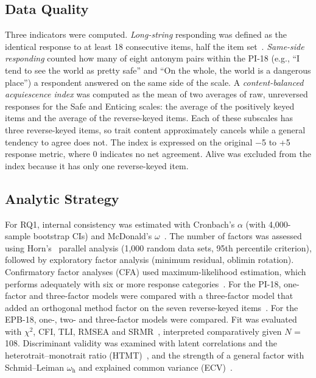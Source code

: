 \documentclass[journal,a4paper]{IEEEtran}
\begin{document}
\subsection{Data Quality}

Three indicators were computed. \emph{Long-string} responding was defined as the identical response to at least 18 consecutive items, half the item set~\cite{curran2016,meade2012}. \emph{Same-side responding} counted how many of eight antonym pairs within the PI-18 (e.g., ``I tend to see the world as pretty safe'' and ``On the whole, the world is a dangerous place'') a respondent answered on the same side of the scale. A \emph{content-balanced acquiescence index} was computed as the mean of two averages of raw, unreversed responses for the Safe and Enticing scales: the average of the positively keyed items and the average of the reverse-keyed items. Each of these subscales has three reverse-keyed items, so trait content approximately cancels while a general tendency to agree does not. The index is expressed on the original $-$5 to +5 response metric, where 0 indicates no net agreement. Alive was excluded from the index because it has only one reverse-keyed item.

\subsection{Analytic Strategy}

For RQ1, internal consistency was estimated with Cronbach's $\alpha$ (with 4,000-sample bootstrap CIs) and McDonald's $\omega$~\cite{mcneish2018}. The number of factors was assessed using Horn's~\cite{horn1965} parallel analysis (1,000 random data sets, 95th percentile criterion), followed by exploratory factor analysis (minimum residual, oblimin rotation). Confirmatory factor analyses (CFA) used maximum-likelihood estimation, which performs adequately with six or more response categories~\cite{rhemtulla2012}. For the PI-18, one-factor and three-factor models were compared with a three-factor model that added an orthogonal method factor on the seven reverse-keyed items~\cite{marsh1996}. For the EPB-18, one-, two- and three-factor models were compared. Fit was evaluated with $\chi ^2$, CFI, TLI, RMSEA and SRMR~\cite{hu1999}, interpreted comparatively given $N$ = 108. Discriminant validity was examined with latent correlations and the heterotrait–monotrait ratio (HTMT)~\cite{henseler2015}, and the strength of a general factor with Schmid–Leiman $\omega _{\mathrm{h}}$ and explained common variance (ECV)~\cite{rodriguez2016}.
\end{document}
